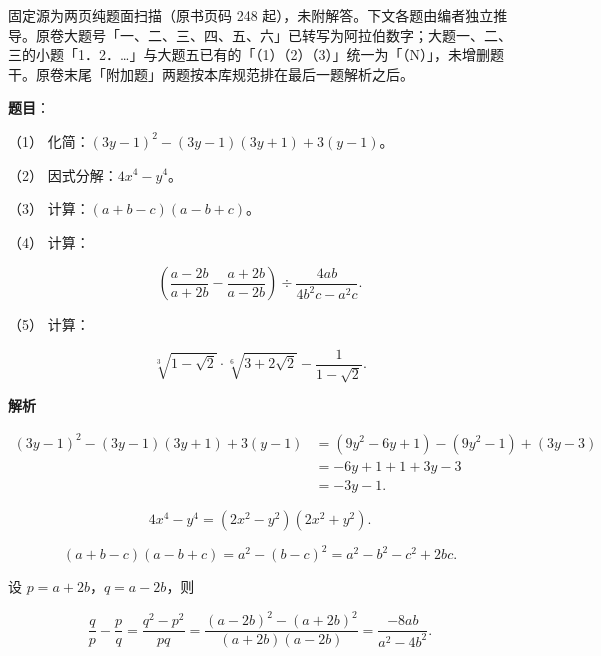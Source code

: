 

\begin{gktip}
固定源为两页纯题面扫描（原书页码 248 起），未附解答。下文各题由编者独立推导。原卷大题号「一、二、三、四、五、六」已转写为阿拉伯数字；大题一、二、三的小题「1．2．…」与大题五已有的「（1）（2）（3）」统一为「（N）」，未增删题干。原卷末尾「附加题」两题按本库规范排在最后一题解析之后。
\end{gktip}

\begin{answer}

\textbf{题目}：

（1） 化简：$(3y-1)^2-(3y-1)(3y+1)+3(y-1)$。

（2） 因式分解：$4x^4-y^4$。

（3） 计算：$(a+b-c)(a-b+c)$。

（4） 计算：

\nopagebreak[4]
\[
\left(\frac{a-2b}{a+2b}-\frac{a+2b}{a-2b}\right)\div\frac{4ab}{4b^2c-a^2c}.
\]

（5） 计算：

\nopagebreak[4]
\[
\sqrt[3]{1-\sqrt2}\cdot\sqrt[6]{3+2\sqrt2}-\frac1{1-\sqrt2}.
\]

\textbf{解析}


\nopagebreak[4]
\[
\begin{aligned}
(3y-1)^2-(3y-1)(3y+1)+3(y-1)
&=(9y^2-6y+1)-(9y^2-1)+(3y-3)\\
&=-6y+1+1+3y-3\\
&=-3y-1.
\end{aligned}
\]


\nopagebreak[4]
\[
4x^4-y^4=(2x^2-y^2)(2x^2+y^2).
\]


\nopagebreak[4]
\[
(a+b-c)(a-b+c)=a^2-(b-c)^2=a^2-b^2-c^2+2bc.
\]


设 $p=a+2b$，$q=a-2b$，则

\nopagebreak[4]
\[
\frac{q}{p}-\frac{p}{q}=\frac{q^2-p^2}{pq}
=\frac{(a-2b)^2-(a+2b)^2}{(a+2b)(a-2b)}
=\frac{-8ab}{a^2-4b^2}.
\]


\end{answer}
